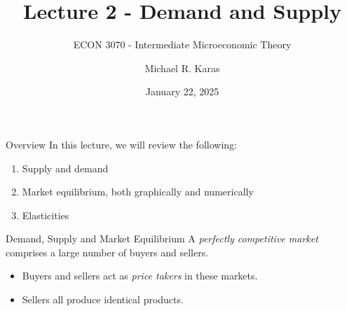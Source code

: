 \documentclass[12pt,t]{beamer}
\author{Michael R. Karas}
\title{Lecture 2 - Demand and Supply}
\subtitle{ECON 3070 - Intermediate Microeconomic Theory}
\date{January 22, 2025}
\begin{document}
\begin{frame}
  \titlepage
\end{frame}

\begin{frame}{Overview}
  In this lecture, we will review the following:
  \begin{enumerate}
    \item Supply and demand

    \item Market equilibrium, both graphically and numerically

    \item Elasticities
  \end{enumerate}
\end{frame}

\begin{frame}{Demand, Supply and Market Equilibrium}
  A \textit{perfectly competitive market} comprises a large number of buyers and sellers.
  \begin{itemize}
    \item Buyers and sellers act as \textit{price takers} in these markets.
    \item Sellers all produce identical products.
  \end{itemize}
\end{frame}
\end{document}
